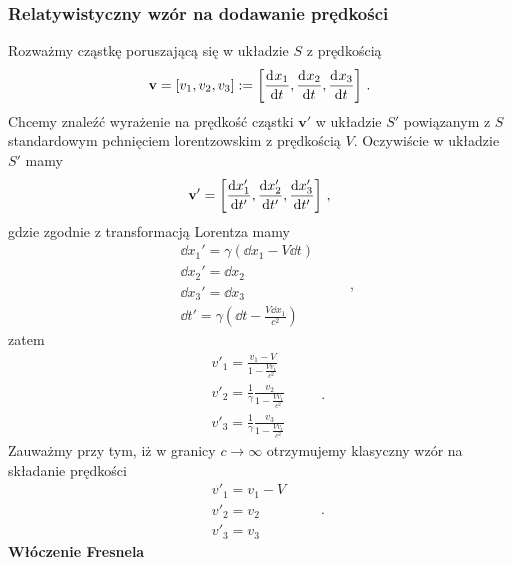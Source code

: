 \documentclass[../main.tex]{subfiles}
\begin{document}
\subsubsection{Relatywistyczny wzór na dodawanie prędkości}
Rozważmy cząstkę poruszającą się w układzie \(S\) z prędkością
\begin{equation*}
    \mathbf{v}=[v_1,v_2,v_3]:=\left[\dv[]{x_1}{t},\dv[]{x_2}{t},\dv[]{x_3}{t}\right]\,.
\end{equation*}
Chcemy znaleźć wyrażenie na prędkość cząstki \(\mathbf{v}'\) w układzie \(S'\) powiązanym z \(S\)
standardowym pchnięciem lorentzowskim z prędkością \(V\). Oczywiście w układzie \(S'\) mamy
\begin{equation*}
    \mathbf{v}'=\left[\dv{x_{1}'}{t'},\dv{x'_2}{t'},\dv{x'_3}{t'}\right]\,,
\end{equation*}
gdzie zgodnie z transformacją Lorentza mamy
\begin{equation*}
    \begin{split}
        &\dd{x_1'}=\gamma(\dd{x_1}-V\dd{t})\\
        &\dd{x_2'}=\dd{x_2}\\
        &\dd{x_3'}=\dd{x_3}\\
        &\dd{t'}=\gamma\left(\dd{t}-\frac{V\dd{x_1}}{c^2}\right)
    \end{split}\quad\quad\,,
\end{equation*}
zatem
\begin{equation*}
    \begin{split}
        &v'_1=\frac{v_1-V}{1-\frac{Vv_1}{c^2}}\\
        &v'_2=\frac{1}{\gamma}\frac{v_2}{1-\frac{Vv_1}{c^2}}\\
        &v'_3=\frac{1}{\gamma}\frac{v_3}{1-\frac{Vv_1}{c^2}}
    \end{split}\quad\quad\,.
\end{equation*}
Zauważmy przy tym, iż w granicy \(c\to\infty\) otrzymujemy klasyczny wzór na składanie prędkości
\begin{equation*}
    \begin{split}
        &v'_1=v_1-V\\
        &v'_2= v_2\\
        &v'_3= v_3
    \end{split}\quad\quad\,.
\end{equation*}
\textbf{Włóczenie Fresnela}
\medskip
\end{document}
